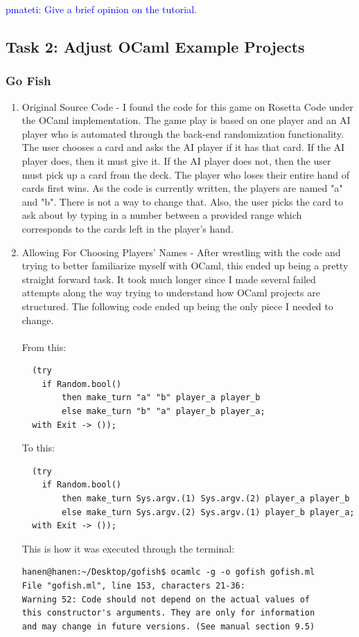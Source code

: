 \documentclass{article}
\newcommand{\PM}[1]{\textcolor{Blue}{pmateti: #1}}%
\begin{document}
\PM{Give a brief opinion on the tutorial.}

\subsection{Task 2: Adjust OCaml Example Projects}
\subsubsection{Go Fish}
\begin{enumerate}
\item Original Source Code - I found the code for this game on Rosetta Code under the OCaml implementation. The game play is based on one player and an AI player who is automated through the back-end randomization functionality. The user chooses a card and asks the AI player if it has that card. If the AI player does, then it must give it. If the AI player does not, then the user must pick up a card from the deck. The player who loses their entire hand of cards first wins. As the code is currently written, the players are named "a" and "b". There is not a way to change that. Also, the user picks the card to ask about by typing in a number between a provided range which corresponds to the cards left in the player's hand.
\item Allowing For Choosing Players' Names - After wrestling with the code and trying to better familiarize myself with OCaml, this ended up being a pretty straight forward task. It took much longer since I made several failed attempts along the way trying to understand how OCaml projects are structured. The following code ended up being the only piece I needed to change. \\ \\
From this:
\begin{verbatim}
  (try
    if Random.bool()
        then make_turn "a" "b" player_a player_b
        else make_turn "b" "a" player_b player_a;
  with Exit -> ());
\end{verbatim}

To this:
\begin{verbatim}
  (try
    if Random.bool()
        then make_turn Sys.argv.(1) Sys.argv.(2) player_a player_b
        else make_turn Sys.argv.(2) Sys.argv.(1) player_b player_a;
  with Exit -> ());
\end{verbatim}

This is how it was executed through the terminal:
\begin{verbatim}
hanen@hanen:~/Desktop/gofish$ ocamlc -g -o gofish gofish.ml
File "gofish.ml", line 153, characters 21-36:
Warning 52: Code should not depend on the actual values of
this constructor's arguments. They are only for information
and may change in future versions. (See manual section 9.5)
\end{verbatim}


\end{enumerate}
\end{document}
